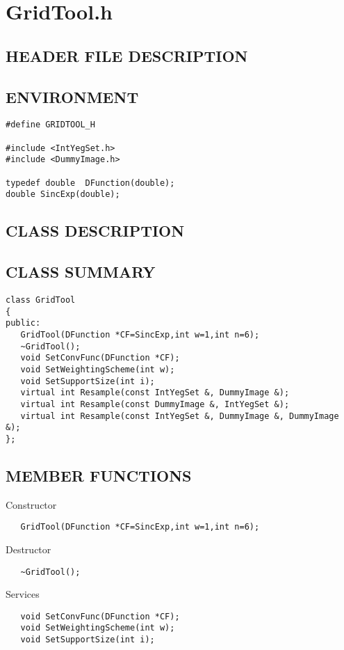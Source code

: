 \clearpage
\section{GridTool.h}

\subsection*{HEADER FILE DESCRIPTION}
  
\subsection*{ENVIRONMENT}
\begin{verbatim}
#define GRIDTOOL_H

#include <IntYegSet.h>
#include <DummyImage.h>

typedef double  DFunction(double);
double SincExp(double);
\end{verbatim}

\subsection*{CLASS DESCRIPTION}

\subsection*{CLASS SUMMARY}
\begin{verbatim}
class GridTool
{
public:
   GridTool(DFunction *CF=SincExp,int w=1,int n=6);
   ~GridTool();
   void SetConvFunc(DFunction *CF);
   void SetWeightingScheme(int w);
   void SetSupportSize(int i);
   virtual int Resample(const IntYegSet &, DummyImage &);
   virtual int Resample(const DummyImage &, IntYegSet &); 
   virtual int Resample(const IntYegSet &, DummyImage &, DummyImage &);
};
\end{verbatim}

\subsection*{MEMBER FUNCTIONS}
        Constructor
\begin{verbatim}
   GridTool(DFunction *CF=SincExp,int w=1,int n=6);
\end{verbatim}

        Destructor
\begin{verbatim}
   ~GridTool();
\end{verbatim}

        Services
\begin{verbatim}
   void SetConvFunc(DFunction *CF);
   void SetWeightingScheme(int w);
   void SetSupportSize(int i);
\end{verbatim}

